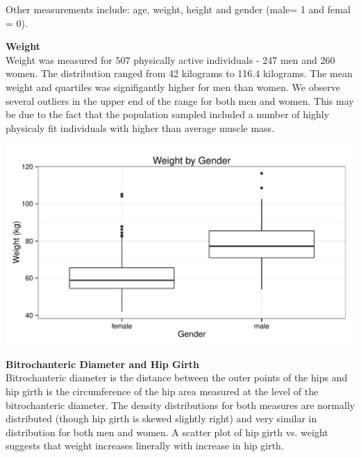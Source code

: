 \documentclass[11pt]{article}\usepackage[]{graphicx}\usepackage[]{color}
\makeatletter
\def\maxwidth{ %
  \ifdim\Gin@nat@width>\linewidth
    \linewidth
  \else
    \Gin@nat@width
  \fi
}
\newenvironment{knitrout}{}{} %
\makeatother
\begin{document}
Other measurements include: age, weight, height and gender (male= 1 and femal = 0).\\


\newpage

\textbf{Weight}\\ %
   
Weight was measured for 507 physically active individuals - 247 men and 260 women. The distribution ranged from 42 kilograms to 116.4 kilograms. The mean weight and quartiles was signifigantly higher for men than women. We observe several outliers in the upper end of the range for both men and women. This may be due to the fact that the population sampled included a number of highly physicaly fit individuals with higher than average muscle mass.

\begin{knitrout}
\color{fgcolor}
\includegraphics[width=\maxwidth]{figure/weight_plot} 

\end{knitrout}



\newpage

\textbf{Bitrochanteric Diameter and Hip Girth}\\ %
 
Bitrochanteric diameter is the distance between the outer points of the hips and hip girth is the circumference of the hip area measured at the level of the bitrochanteric diameter. The density distributions for both measures are normally distributed (though hip girth is skewed slightly right) and very similar in distribution for both men and women. A scatter plot of hip girth vs. weight suggests that weight increases linerally with increase in hip girth.
\end{document}
